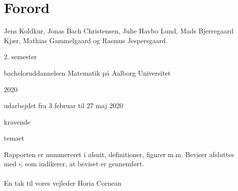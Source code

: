 \chapter{Forord}

Jens Koldkur,
Jonas Bach Christensen,
Julie Havbo Lund,
Mads Bjerregaard Kjær,
Mathias Gammelgaard og
Rasmus Jespersgaard.
	
2. semester 
	
bacheloruddannelsen Matematik på Aalborg Universitet
	
2020
	
udarbejdet fra 3 februar til 27 maj 2020
	
kravende 
	
temaet 
	
Rapporten er nummereret i afsnit, definitioner, figurer m.m.
Beviser afsluttes med $\square$, som indikerer, at beviset er gennemført. \\\\

En tak til vores vejleder Horia Cornean